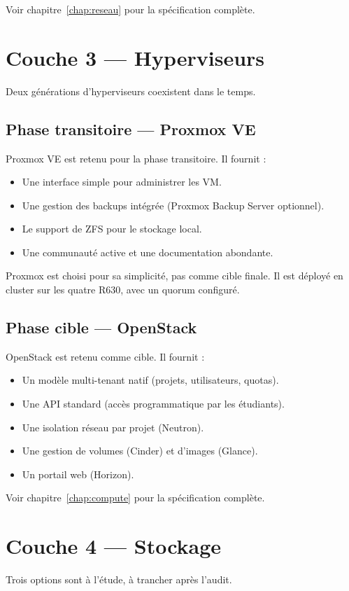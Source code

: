 Voir chapitre~\ref{chap:reseau} pour la spécification complète.

\section{Couche 3 — Hyperviseurs}
Deux générations d'hyperviseurs coexistent dans le temps.

\subsection{Phase transitoire — Proxmox VE}
Proxmox VE est retenu pour la phase transitoire. Il fournit :
\begin{itemize}
  \item Une interface simple pour administrer les VM.
  \item Une gestion des backups intégrée (Proxmox Backup Server optionnel).
  \item Le support de ZFS pour le stockage local.
  \item Une communauté active et une documentation abondante.
\end{itemize}

Proxmox est choisi pour sa simplicité, pas comme cible finale. Il est déployé en cluster sur les quatre R630, avec un quorum configuré.

\subsection{Phase cible — OpenStack}
OpenStack est retenu comme cible. Il fournit :
\begin{itemize}
  \item Un modèle multi-tenant natif (projets, utilisateurs, quotas).
  \item Une API standard (accès programmatique par les étudiants).
  \item Une isolation réseau par projet (Neutron).
  \item Une gestion de volumes (Cinder) et d'images (Glance).
  \item Un portail web (Horizon).
\end{itemize}

Voir chapitre~\ref{chap:compute} pour la spécification complète.

\section{Couche 4 — Stockage}
Trois options sont à l'étude, à trancher après l'audit.

